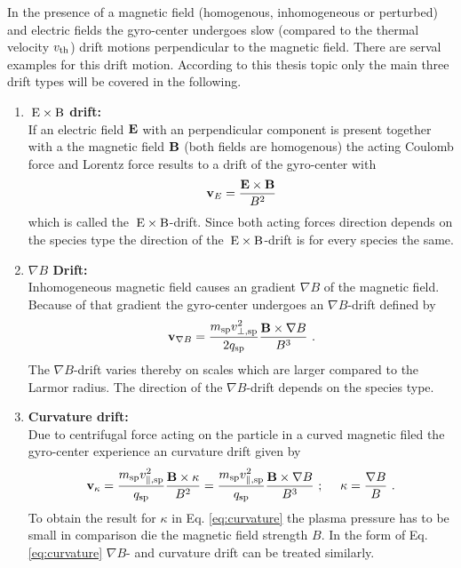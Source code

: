 In the presence of a magnetic field (homogenous, inhomogeneous or perturbed) and electric fields the gyro-center undergoes slow (compared to the thermal velocity $v_{\mathrm{th}}$) drift motions perpendicular to the magnetic field. There are serval examples for this drift motion. According to this thesis topic only the main three drift types will be covered in the following.

\begin{enumerate}
    \item \textbf{$\mathrm{\:E}\times\mathrm{B}$ drift:}\\
    If an electric field $\boldsymbol{\mathbf{E}}$ with an perpendicular component is present together with a the magnetic field $\boldsymbol{\mathbf{B}}$ (both fields are homogenous) the acting Coulomb force and Lorentz force results to a drift of the gyro-center with
    \begin{gather}
        \boldsymbol{\mathbf{v}}_{E} = \frac{\boldsymbol{\mathbf{E}}\times\boldsymbol{\mathbf{B}}}{B^2}
        \label{eq:exb}
    \end{gather}
    which is called the $\mathrm{\:E}\times\mathrm{B}$-drift. Since both acting forces direction depends on the species type the direction of the $\mathrm{\:E}\times\mathrm{B}$-drift is for every species the same.\\
    \item \textbf{$\nabla B$ Drift:}\\
    Inhomogeneous magnetic field causes an gradient $\nabla B$ of the magnetic field. Because of that gradient the gyro-center undergoes an $\nabla B$-drift defined by
    \begin{gather}
        \boldsymbol{\mathbf{v}}_{\nabla B} = \frac{m_\mathrm{sp} v^2_{\perp,\mathrm{sp}}}{2 q_\mathrm{sp}}\frac{\boldsymbol{\mathbf{B}}\times \nabla B}{B^3}~.
        \label{eq:gradB}
    \end{gather}
    The $\nabla B$-drift varies thereby on scales which are larger compared to the Larmor radius. The direction of the $\nabla B$-drift depends on the species type. \\
    \item \textbf{Curvature drift:}\\
    Due to centrifugal force acting on the particle in a curved magnetic filed the gyro-center experience an curvature drift given by
    \begin{gather}
        \boldsymbol{\mathbf{v}}_{\kappa} = \frac{m_\mathrm{sp} v^2_{\parallel,\mathrm{sp}}}{q_\mathrm{sp}}\frac{\boldsymbol{\mathbf{B}}\times \kappa}{B^2} = \frac{m_\mathrm{sp} v^2_{\parallel,\mathrm{sp}}}{q_\mathrm{sp}} \frac{\boldsymbol{\mathbf{B}}\times \nabla B}{B^3}~;~~~~\kappa = \frac{\nabla B}{B}~.
        \label{eq:curvature}
    \end{gather}
    To obtain the result for $\kappa$ in Eq. \ref{eq:curvature} the plasma pressure has to be small in comparison die the magnetic field strength $B$. In the form of Eq. \ref{eq:curvature} $\nabla B$- and curvature drift can be treated similarly.
\end{enumerate}



